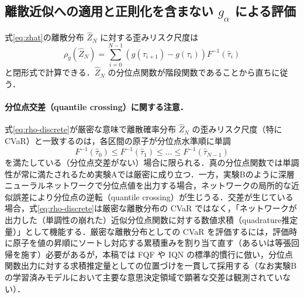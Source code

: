\documentclass[a4paper,10pt]{jsarticle}
\theoremstyle{definition}
\newcommand{\Finv}{F^{-1}}
\begin{document}
\subsection{離散近似への適用と正則化を含まない $g_\alpha$ による評価}
式\eqref{eq:zhat}の離散分布 $\hat Z_N$ に対する歪みリスク尺度は
\begin{equation}
  \rho_g(\hat Z_N)=\sum_{i=0}^{N-1}\left(g(\tau_{i+1})-g(\tau_i)\right)\Finv(\hat\tau_i)
  \label{eq:rho-discrete}
\end{equation}
と閉形式で計算できる．$\hat Z_N$ の分位点関数が階段関数であることから直ちに従う．

\paragraph{分位点交差（quantile crossing）に関する注意．}
式\eqref{eq:rho-discrete}が厳密な意味で離散確率分布 $\hat Z_N$ の歪みリスク尺度（特に CVaR）と一致するのは，各区間の原子が分位点水準順に単調
\begin{equation*}
  \Finv(\hat\tau_0)\le\Finv(\hat\tau_1)\le\dots\le\Finv(\hat\tau_{N-1})
\end{equation*}
を満たしている（分位点交差がない）場合に限られる．真の分位点関数では単調性が常に満たされるため実験Aでは厳密に成り立つ．一方，実験Bのように深層ニューラルネットワークで分位点値を出力する場合，ネットワークの局所的な近似誤差により分位点の逆転（quantile crossing）が生じうる．交差が生じている場合，式\eqref{eq:rho-discrete}は厳密な離散分布の CVaR ではなく，「ネットワークが出力した（単調性の崩れた）近似分位点関数に対する数値求積（quadrature推定量）」として機能する．厳密な離散分布としての CVaR を評価するには，評価時に原子を値の昇順にソートし対応する累積重みを割り当て直す（あるいは等張回帰を施す）必要があるが，本稿では FQF や IQN の標準的慣行に倣い，分位点関数出力に対する求積推定量としての位置づけを一貫して採用する（なお実験Bの学習済みモデルにおいて主要な意思決定領域で顕著な交差は観測されていない）．
\end{document}
